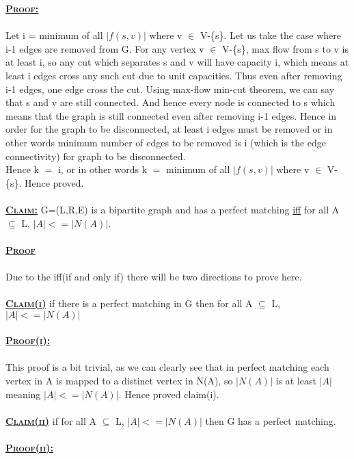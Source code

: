 \documentclass[a4 paper]{article}
\begin{document}
\textbf{\underline{\textsc{Proof:}}}\\\\
Let i = minimum of all $|f(s,v)|$ where v $\in$ V-\{s\}. Let us take the case where i-1 edges are removed from G. For any vertex v $\in$ V-\{s\}, max flow from s to v is at least i, so any cut which separates s and v will have capacity i, which means at least i edges cross any such cut due to unit capacities. Thus even after removing i-1 edges, one edge cross the cut. Using max-flow min-cut theorem, we can say that s and v are still connected. And hence every node is connected to s which means that the graph is still connected even after removing i-1 edges. Hence in order for the graph to be disconnected, at least i edges must be removed or in other words minimum number of edges to be removed is i (which is the edge connectivity) for graph to be disconnected.\\ Hence k $=$ i, or in other words k $=$ minimum of all $|f(s,v)|$ where v $\in$ V-\{s\}. Hence proved.\\\\
\newpage
{}
\textbf{\underline{\textsc{Claim:}}} G=(L,R,E) is a bipartite graph and has a perfect matching \underline{iff} for all A $\subseteq$ L, $|A|<=|N(A)|$.\\\\
\textbf{\underline{\textsc{Proof}}}\\\\
Due to the iff(if and only if) there will be two directions to prove here.\\\\
\textbf{\underline{\textsc{Claim(i)}}} if there is a perfect matching in G then for all A $\subseteq$ L, $|A|<=|N(A)|$\\\\
\textbf{\underline{\textsc{Proof(i):}}}\\\\
This proof is a bit trivial, as we can clearly see that in perfect matching each vertex in A is mapped to a distinct vertex in N(A), so $|N(A)|$ is at least $|A|$ meaning $|A|<=|N(A)|$. Hence proved claim(i).\\\\
\textbf{\underline{\textsc{Claim(ii)}}} if for all A $\subseteq$ L, $|A|<=|N(A)|$ then G has a perfect matching.\\\\
\textbf{\underline{\textsc{Proof(ii):}}}\\\\
\end{document}
